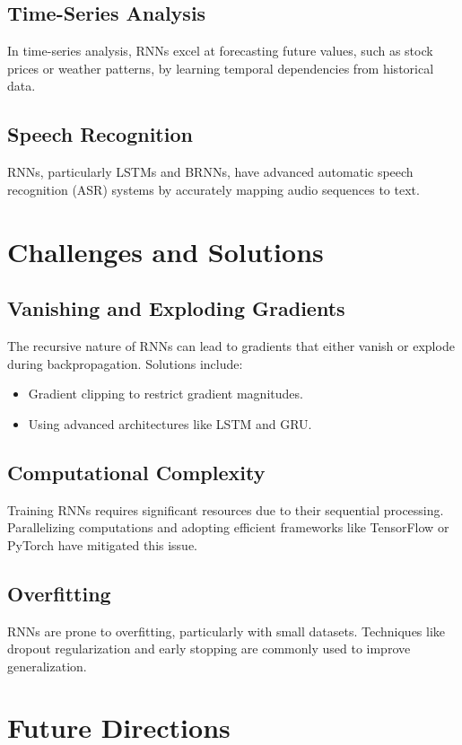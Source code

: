 \subsection{Time-Series Analysis}
In time-series analysis, RNNs excel at forecasting future values, such as stock prices or weather patterns, by learning temporal dependencies from historical data.

\subsection{Speech Recognition}
RNNs, particularly LSTMs and BRNNs, have advanced automatic speech recognition (ASR) systems by accurately mapping audio sequences to text.

\section{Challenges and Solutions}
\subsection{Vanishing and Exploding Gradients}
The recursive nature of RNNs can lead to gradients that either vanish or explode during backpropagation. Solutions include:
\begin{itemize}
    \item Gradient clipping to restrict gradient magnitudes.
    \item Using advanced architectures like LSTM and GRU.
\end{itemize}

\subsection{Computational Complexity}
Training RNNs requires significant resources due to their sequential processing. Parallelizing computations and adopting efficient frameworks like TensorFlow or PyTorch have mitigated this issue.

\subsection{Overfitting}
RNNs are prone to overfitting, particularly with small datasets. Techniques like dropout regularization and early stopping are commonly used to improve generalization.

\section{Future Directions}
